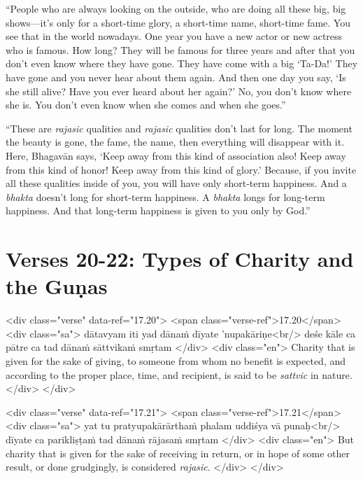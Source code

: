 \enquote{People who are always looking on the outside, who are doing all these big, big shows---it’s only for a short-time glory, a short-time name, short-time fame. You see that in the world nowadays. One year you have a new actor or new actress who is famous. How long? They will be famous for three years and after that you don’t even know where they have gone. They have come with a big \enquote{Ta-Da!} They have gone and you never hear about them again. And then one day you say, \enquote{Is she still alive? Have you ever heard about her again?} No, you don’t know where she is. You don’t even know when she comes and when she goes.}

\enquote{These are \textit{rajasic} qualities and \textit{rajasic} qualities don’t last for long. The moment the beauty is gone, the fame, the name, then everything will disappear with it. Here, Bhagavān says, \enquote{Keep away from this kind of association also! Keep away from this kind of honor! Keep away from this kind of glory.} Because, if you invite all these qualities inside of you, you will have only short-term happiness. And a \textit{bhakta} doesn’t long for short-term happiness. A \textit{bhakta} longs for long-term happiness. And that long-term happiness is given to you only by God.}

\section{Verses 20-22: Types of Charity and the Guṇas}\label{sec-verses-20-22-types-of-charity-and-the-gunas}


\begin{html}
<div class="verse" data-ref="17.20">
  <span class="verse-ref">17.20</span>
  <div class="sa">
    dātavyam iti yad dānaṁ dīyate ’nupakāriṇe<br/>
    deśe kāle ca pātre ca tad dānaṁ sāttvikaṁ smṛtam
  </div>
  <div class="en">
    Charity that is given for the sake of giving, to someone from whom no benefit is expected, and according to the proper place, time, and recipient, is said to be \textit{sattvic} in nature.
  </div>
</div>
\end{html}



\begin{html}
<div class="verse" data-ref="17.21">
  <span class="verse-ref">17.21</span>
  <div class="sa">
    yat tu pratyupakārārthaṁ phalam uddiśya vā punaḥ<br/>
    dīyate ca parikliṣṭaṁ tad dānaṁ rājasaṁ smṛtam
  </div>
  <div class="en">
    But charity that is given for the sake of receiving in return, or in hope of some other result, or done grudgingly, is considered \textit{rajasic}.
  </div>
</div>
\end{html}



